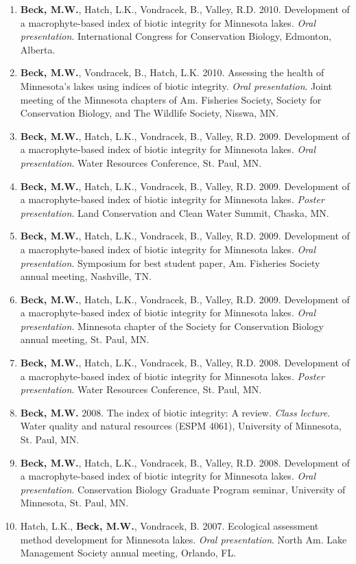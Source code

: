 \documentclass[letterpaper,12pt]{article}
\begin{document}
\begin{enumerate}
\item {\bf Beck, M.W.}, Hatch, L.K., Vondracek, B., Valley, R.D. 2010. Development of a macrophyte-based index of biotic integrity for Minnesota lakes. \textit{Oral presentation}. International Congress for Conservation Biology, Edmonton, Alberta.

\item {\bf Beck, M.W.}, Vondracek, B., Hatch, L.K. 2010. Assessing the health of Minnesota's lakes using indices of biotic integrity. \textit{Oral presentation}. Joint meeting of the Minnesota chapters of Am. Fisheries Society, Society for Conservation Biology, and The Wildlife Society, Nisswa, MN.

\item {\bf Beck, M.W.}, Hatch, L.K., Vondracek, B., Valley, R.D. 2009. Development of a macrophyte-based index of biotic integrity for Minnesota lakes. \textit{Oral presentation}. Water Resources Conference, St. Paul, MN.

\item {\bf Beck, M.W.}, Hatch, L.K., Vondracek, B., Valley, R.D. 2009. Development of a macrophyte-based index of biotic integrity for Minnesota lakes. \textit{Poster presentation}. Land Conservation and Clean Water Summit, Chaska, MN.

\item {\bf Beck, M.W.}, Hatch, L.K., Vondracek, B., Valley, R.D. 2009. Development of a macrophyte-based index of biotic integrity for Minnesota lakes. \textit{Oral presentation}. Symposium for best student paper, Am. Fisheries Society annual meeting, Nashville, TN.

\item {\bf Beck, M.W.}, Hatch, L.K., Vondracek, B., Valley, R.D. 2009. Development of a macrophyte-based index of biotic integrity for Minnesota lakes. \textit{Oral presentation}. Minnesota chapter of the Society for Conservation Biology annual meeting, St. Paul, MN.

\item {\bf Beck, M.W.}, Hatch, L.K., Vondracek, B., Valley, R.D. 2008. Development of a macrophyte-based index of biotic integrity for Minnesota lakes. \textit{Poster presentation}. Water Resources Conference, St. Paul, MN.

\item {\bf Beck, M.W.} 2008. The index of biotic integrity: A review. \textit{Class lecture}. Water quality and natural resources (ESPM 4061), University of Minnesota, St. Paul, MN.

\item {\bf Beck, M.W.}, Hatch, L.K., Vondracek, B., Valley, R.D. 2008. Development of a macrophyte-based index of biotic integrity for Minnesota lakes. \textit{Oral presentation}. Conservation Biology Graduate Program seminar, University of Minnesota, St. Paul, MN.

\item Hatch, L.K., {\bf Beck, M.W.}, Vondracek, B. 2007. Ecological assessment method development for Minnesota lakes. \textit{Oral presentation}. North Am. Lake Management Society annual meeting, Orlando, FL.

\end{enumerate}
\end{document}
